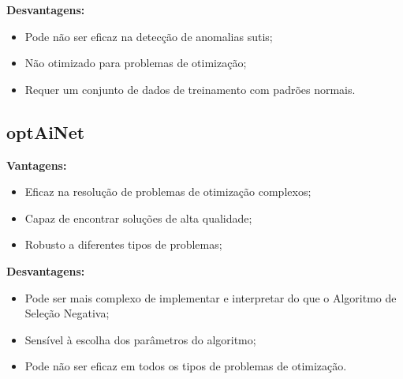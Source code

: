\noindent \textbf{Desvantagens:}

\begin{itemize}
    \item Pode não ser eficaz na detecção de anomalias sutis;
    
    \item Não otimizado para problemas de otimização;

    \item Requer um conjunto de dados de treinamento com padrões normais.
\end{itemize}

\subsection{optAiNet}

\textbf{Vantagens:}

\begin{itemize}
    \item Eficaz na resolução de problemas de otimização complexos;
    
    \item Capaz de encontrar soluções de alta qualidade;

    \item Robusto a diferentes tipos de problemas;
\end{itemize}

\noindent \textbf{Desvantagens:}

\begin{itemize}
    \item Pode ser mais complexo de implementar e interpretar do que o Algoritmo de Seleção Negativa;
    
    \item Sensível à escolha dos parâmetros do algoritmo;

    \item Pode não ser eficaz em todos os tipos de problemas de otimização.
\end{itemize}
